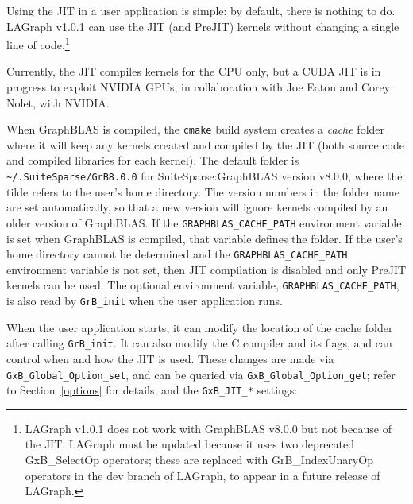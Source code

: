 \documentclass[12pt]{article}
\begin{document}
Using the JIT in a user application is simple:  by default, there is nothing
to do.  LAGraph v1.0.1 can use the JIT (and PreJIT) kernels without changing
a single line of code.\footnote{LAGraph v1.0.1 does not work with GraphBLAS
v8.0.0 but not because of the JIT.  LAGraph must be updated because it uses two
deprecated {\sf GxB\_SelectOp} operators; these are replaced with {\sf
GrB\_IndexUnaryOp} operators in the {\sf dev} branch of LAGraph, to appear
in a future release of LAGraph.}

Currently, the JIT compiles kernels for the CPU only, but a CUDA JIT is in
progress to exploit NVIDIA GPUs, in collaboration with Joe Eaton and
Corey Nolet, with NVIDIA.

When GraphBLAS is compiled, the \verb'cmake' build system creates a {\em cache}
folder where it will keep any kernels created and compiled by the JIT
(both source code and compiled libraries for each kernel).  The
default folder is \verb'~/.SuiteSparse/GrB8.0.0' for SuiteSparse:GraphBLAS
version v8.0.0, where the tilde refers to the user's home directory.
The version numbers in the folder name are set automatically, so that a new
version will ignore kernels compiled by an older version of GraphBLAS.  If the
\verb'GRAPHBLAS_CACHE_PATH' environment variable is set when GraphBLAS is
compiled, that variable defines the folder.  If the user's home directory
cannot be determined and the \verb'GRAPHBLAS_CACHE_PATH' environment variable
is not set, then JIT compilation is disabled and only PreJIT kernels can be
used.  The optional environment variable, \verb'GRAPHBLAS_CACHE_PATH', is also
read by \verb'GrB_init' when the user application runs.

When the user application starts, it can modify the location of the cache
folder after calling \verb'GrB_init'.  It can also modify the C compiler and
its flags, and can control when and how the JIT is used.
These changes are
made via \verb'GxB_Global_Option_set', and can be queried via
\verb'GxB_Global_Option_get'; refer to Section~\ref{options} for details, and
the \verb'GxB_JIT_*' settings:
\end{document}
